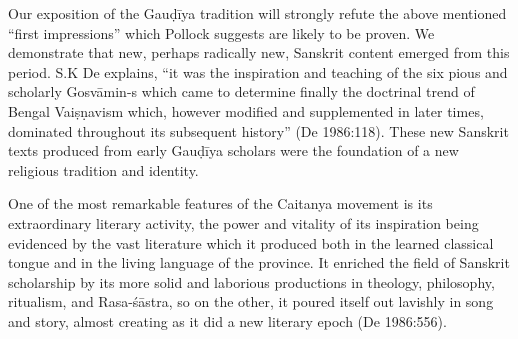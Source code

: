Our exposition of the Gauḍīya tradition will strongly refute the above mentioned “first impressions” which Pollock suggests are likely to be proven. We demonstrate that new, perhaps radically new, Sanskrit content emerged from this period. S.K De explains, “it was the inspiration and teaching of the six pious and scholarly Gosvāmin-s which came to determine finally the doctrinal trend of Bengal Vaiṣṇavism which, however modified and supplemented in later times, dominated throughout its subsequent history” (De 1986:118). These new Sanskrit texts produced from early Gauḍīya scholars were the foundation of a new religious tradition and identity. 
\begin{myquote}
\eleven
One of the most remarkable features of the Caitanya movement is its extraordinary literary activity, the power and vitality of its inspiration being evidenced by the vast literature which it produced both in the learned classical tongue and in the living language of the province. It enriched the field of Sanskrit scholarship by its more solid and laborious productions in theology, philosophy, ritualism, and Rasa-śāstra, so on the other, it poured itself out lavishly in song and story, almost creating as it did a new literary epoch \hfill (De 1986:556). 
\end{myquote}

